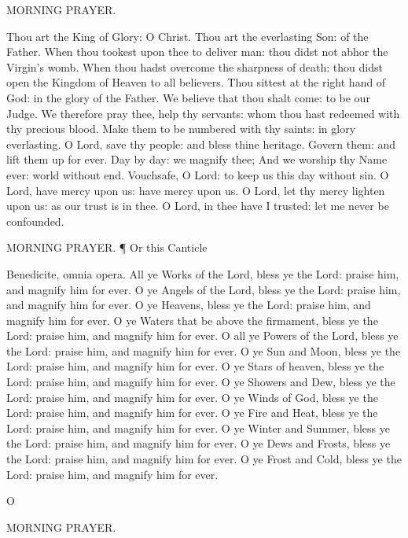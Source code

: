 MORNING PRAYER.

Thou art the King of Glory: O Christ. Thou art the everlasting Son: of the Father. When thou tookest upon thee to deliver man: thou didst not abhor the Virgin’s womb. When thou hadst overcome the sharpness of death: thou didst open the Kingdom of Heaven to all believers. Thou sittest at the right hand of God: in the glory of the Father. We believe that thou shalt come: to be our Judge. We therefore pray thee, help thy servants: whom thou hast redeemed with thy precious blood. Make them to be numbered with thy saints: in glory everlasting. O Lord, save thy people: and bless thine heritage. Govern them: and lift them up for ever. Day by day: we magnify thee; And we worship thy Name ever: world without end. Vouchsafe, O Lord: to keep us this day without sin. O Lord, have mercy upon us: have mercy upon us. O Lord, let thy mercy lighten upon us: as our trust is in thee. O Lord, in thee have I trusted: let me never be confounded.

MORNING PRAYER. ¶ Or this Canticle

Benedicite, omnia opera. All ye Works of the Lord, bless ye the Lord: praise him, and magnify him for ever. O ye Angels of the Lord, bless ye the Lord: praise him, and magnify him for ever. O ye Heavens, bless ye the Lord: praise him, and magnify him for ever. O ye Waters that be above the firmament, bless ye the Lord: praise him, and magnify him for ever. O all ye Powers of the Lord, bless ye the Lord: praise him, and magnify him for ever. O ye Sun and Moon, bless ye the Lord: praise him, and magnify him for ever. O ye Stars of heaven, bless ye the Lord: praise him, and magnify him for ever. O ye Showers and Dew, bless ye the Lord: praise him, and magnify him for ever. O ye Winds of God, bless ye the Lord: praise him, and magnify him for ever. O ye Fire and Heat, bless ye the Lord: praise him, and magnify him for ever. O ye Winter and Summer, bless ye the Lord: praise him, and magnify him for ever. O ye Dews and Frosts, bless ye the Lord: praise him, and magnify him for ever. O ye Frost and Cold, bless ye the Lord: praise him, and magnify him for ever.

O

MORNING PRAYER.

